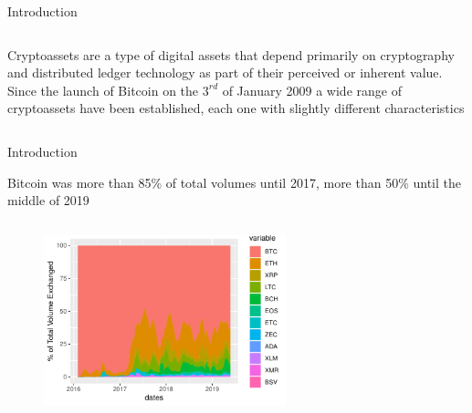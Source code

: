 \documentclass[aspectratio=169]{beamer}
\begin{document}
{
	\begin{frame}{Introduction}
		 \begin{columns}[T]
			Cryptoassets are a type of digital assets that depend primarily on cryptography and distributed ledger technology as part of their perceived or inherent value. Since the launch of Bitcoin on the $3^{rd}$ of January 2009 a wide range of cryptoassets have been established, each one with slightly different characteristics
		\end{columns}
	\end{frame}
}


\begin{frame}{Introduction}
        \begin{minipage}[t][1.2cm][c]{\dimexpr\textwidth-2\fboxsep-2\fboxrule\relax}
        Bitcoin was more than 85\% of total volumes until 2017,  more than 50\% until the middle of 2019
        \end{minipage}
		\begin{figure}
			\centering
			\includegraphics[height=5.7cm, width=7cm]{Images/volnoline.pdf}
		\end{figure}
\end{frame}
\end{document}
